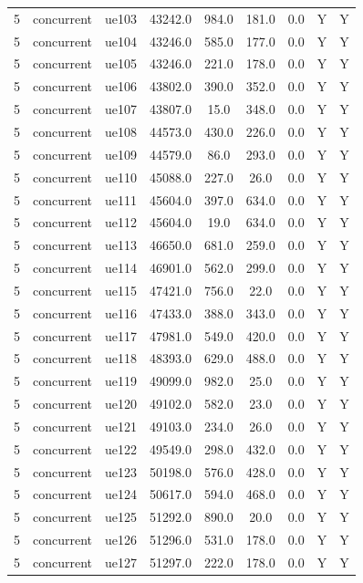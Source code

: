 \begin{table}[ht]
\begin{tabular}{|c|c|c|c|c|c|c|c|c|}
5 & concurrent & ue103 & 43242.0 & 984.0 & 181.0 & 0.0 & Y & Y \\
5 & concurrent & ue104 & 43246.0 & 585.0 & 177.0 & 0.0 & Y & Y \\
5 & concurrent & ue105 & 43246.0 & 221.0 & 178.0 & 0.0 & Y & Y \\
5 & concurrent & ue106 & 43802.0 & 390.0 & 352.0 & 0.0 & Y & Y \\
5 & concurrent & ue107 & 43807.0 & 15.0 & 348.0 & 0.0 & Y & Y \\
5 & concurrent & ue108 & 44573.0 & 430.0 & 226.0 & 0.0 & Y & Y \\
5 & concurrent & ue109 & 44579.0 & 86.0 & 293.0 & 0.0 & Y & Y \\
5 & concurrent & ue110 & 45088.0 & 227.0 & 26.0 & 0.0 & Y & Y \\
5 & concurrent & ue111 & 45604.0 & 397.0 & 634.0 & 0.0 & Y & Y \\
5 & concurrent & ue112 & 45604.0 & 19.0 & 634.0 & 0.0 & Y & Y \\
5 & concurrent & ue113 & 46650.0 & 681.0 & 259.0 & 0.0 & Y & Y \\
5 & concurrent & ue114 & 46901.0 & 562.0 & 299.0 & 0.0 & Y & Y \\
5 & concurrent & ue115 & 47421.0 & 756.0 & 22.0 & 0.0 & Y & Y \\
5 & concurrent & ue116 & 47433.0 & 388.0 & 343.0 & 0.0 & Y & Y \\
5 & concurrent & ue117 & 47981.0 & 549.0 & 420.0 & 0.0 & Y & Y \\
5 & concurrent & ue118 & 48393.0 & 629.0 & 488.0 & 0.0 & Y & Y \\
5 & concurrent & ue119 & 49099.0 & 982.0 & 25.0 & 0.0 & Y & Y \\
5 & concurrent & ue120 & 49102.0 & 582.0 & 23.0 & 0.0 & Y & Y \\
5 & concurrent & ue121 & 49103.0 & 234.0 & 26.0 & 0.0 & Y & Y \\
5 & concurrent & ue122 & 49549.0 & 298.0 & 432.0 & 0.0 & Y & Y \\
5 & concurrent & ue123 & 50198.0 & 576.0 & 428.0 & 0.0 & Y & Y \\
5 & concurrent & ue124 & 50617.0 & 594.0 & 468.0 & 0.0 & Y & Y \\
5 & concurrent & ue125 & 51292.0 & 890.0 & 20.0 & 0.0 & Y & Y \\
5 & concurrent & ue126 & 51296.0 & 531.0 & 178.0 & 0.0 & Y & Y \\
5 & concurrent & ue127 & 51297.0 & 222.0 & 178.0 & 0.0 & Y & Y \\

\end{tabular}
\end{table}
